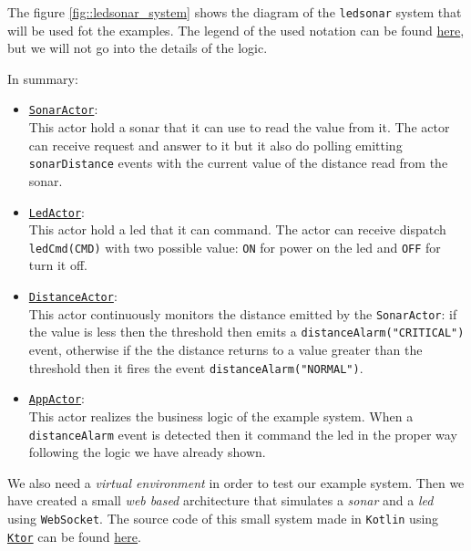 The figure \ref{fig::ledsonar_system} shows the diagram of the \texttt{ledsonar} system that will be used fot the examples. The legend of the used notation can be found \href{https://github.com/anatali/issLab2021/blob/main/it.unibo.issLabStart/userDocs/Legenda.pptx}{here}, 
but we will not go into the details of the logic.

In summary:
\begin{itemize}
	\item \underline{\texttt{SonarActor}}:\\
	This actor hold a sonar that it can use to read the value from it.
	The actor can receive request and answer to it but it also do polling emitting \texttt{sonarDistance} events with the current value of the distance read from the sonar.
	
	\item \underline{\texttt{LedActor}}:\\
	This actor hold a led that it can command.
	The actor can receive dispatch \texttt{ledCmd(CMD)} with two possible value: \texttt{ON} for power on the led and \texttt{OFF} for turn it off.
	
	\item \underline{\texttt{DistanceActor}}:\\
	This actor continuously monitors the distance emitted by the \texttt{SonarActor}: if the value is less then the threshold then emits a \texttt{distanceAlarm("CRITICAL")} event, otherwise if the the distance returns to a value greater than the threshold then it fires the event \texttt{distanceAlarm("NORMAL")}.
	
	\item \underline{\texttt{AppActor}}:\\
	This actor realizes the business logic of the example system. When a \texttt{distanceAlarm} event is detected then it command the led in the proper way following the logic we have already shown.
\end{itemize}

We also need a \textit{virtual environment} in order to test our example system. Then we have created a small \textit{web based} architecture that simulates a \textit{sonar} and a \textit{led} using \texttt{WebSocket}.
The source code of this small system made in \texttt{Kotlin} using \href{https://ktor.io/}{\texttt{Ktor}} can be found \href{https://github.com/LM-96/QA-Extensions/tree/main/it.unibo.ledsonarsystem}{here}.

